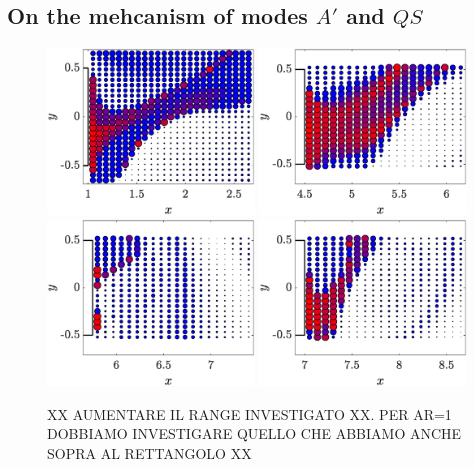 \subsection{On the mehcanism of modes $A'$ and $QS$}

\begin{figure}
  \centering
  \includegraphics[width=0.49\textwidth]{./fig/LagTrac/part_AR1_Re200.eps}
  \includegraphics[width=0.49\textwidth]{./fig/LagTrac/part_AR4p5_Re410.eps}
  \includegraphics[width=0.49\textwidth]{./fig/LagTrac/part_AR5p75_Re550.eps}
  \includegraphics[width=0.49\textwidth]{./fig/LagTrac/part_AR7_Re500.eps}  
  \caption{XX AUMENTARE IL RANGE INVESTIGATO XX. PER AR=1 DOBBIAMO INVESTIGARE QUELLO CHE ABBIAMO ANCHE SOPRA AL RETTANGOLO XX}
  \label{fig:part_res}
\end{figure}    

